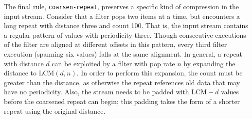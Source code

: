The final rule, {\tt coarsen-repeat}, preserves a specific kind of
compression in the input stream.  Consider that a filter pops two
items at a time, but encounters a long repeat with distance three and
count 100.  That is, the input stream contains a regular pattern of
values with periodicity three.  Though consecutive executions of the
filter are aligned at different offsets in this pattern, every third
filter execution (spanning six values) falls at the same alignment.
In general, a repeat with distance $d$ can be exploited by a filter
with pop rate $n$ by expanding the distance to $\mbox{LCM}(d, n)$.  In
order to perform this expansion, the count must be greater than the
distance, as otherwise the repeat references old data that may have no
periodicity.  Also, the stream needs to be padded with $\mbox{LCM}-d$
values before the coarsened repeat can begin; this padding takes the
form of a shorter repeat using the original distance.



